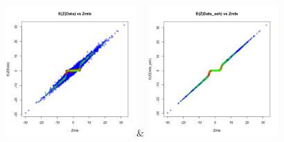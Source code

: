 \begin{figure}[htbp]
\includegraphics[width=5cm]{Figures/scatterplot_fittedtspec.png}&
\includegraphics[width=5cm]{Figures/scatterplot_fittedtspec_ash.png}\\
\hfill


\end{figure}
